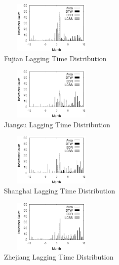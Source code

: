 \begin{figure}
	\centering
	\includegraphics[height=1in, width=2in]{fujian_lag_dis}
	\caption{Fujian Lagging Time Distribution}
	\label{fig:fujian_lag}
\end{figure}

\begin{figure}
	\centering
	\includegraphics[height=1in, width=2in]{jiangsu_lag_dis}
	\caption{Jiangsu Lagging Time Distribution}
	\label{fig:jiangsu_lag}
\end{figure}

\begin{figure}
	\centering
	\includegraphics[height=1in, width=2in]{shanghai_lag_dis}
	\caption{Shanghai Lagging Time Distribution}
	\label{fig:shanghai_lag}
\end{figure}

\begin{figure}
	\centering
	\includegraphics[height=1in, width=2in]{zhejiang_lag_dis}
	\caption{Zhejiang Lagging Time Distribution}
	\label{fig:zhejiang_lag}
\end{figure}